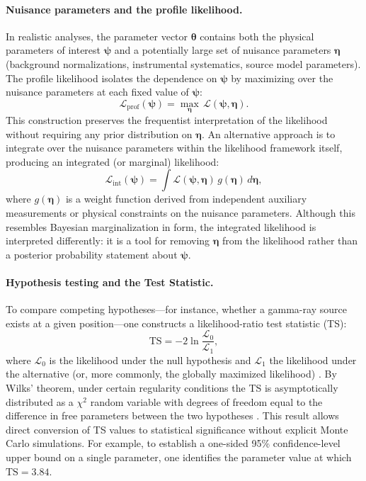 \paragraph{Nuisance parameters and the profile likelihood.}

In realistic analyses, the parameter vector $\boldsymbol{\theta}$ contains both the physical parameters of interest $\boldsymbol{\psi}$ and a potentially large set of nuisance parameters $\boldsymbol{\eta}$ (background normalizations, instrumental systematics, source model parameters). The profile likelihood isolates the dependence on $\boldsymbol{\psi}$ by maximizing over the nuisance parameters at each fixed value of $\boldsymbol{\psi}$:
\begin{equation}
\mathcal{L}_{\mathrm{prof}}(\boldsymbol{\psi}) = \max_{\boldsymbol{\eta}} \, \mathcal{L}(\boldsymbol{\psi}, \boldsymbol{\eta}).
\label{eq:profile_likelihood}
\end{equation}
This construction preserves the frequentist interpretation of the likelihood without requiring any prior distribution on $\boldsymbol{\eta}$. An alternative approach is to integrate over the nuisance parameters within the likelihood framework itself, producing an integrated (or marginal) likelihood:
\begin{equation}
\mathcal{L}_{\mathrm{int}}(\boldsymbol{\psi}) = \int \mathcal{L}(\boldsymbol{\psi}, \boldsymbol{\eta}) \, g(\boldsymbol{\eta}) \, d\boldsymbol{\eta},
\label{eq:integrated_likelihood}
\end{equation}
where $g(\boldsymbol{\eta})$ is a weight function derived from independent auxiliary measurements or physical constraints on the nuisance parameters. Although this resembles Bayesian marginalization in form, the integrated likelihood is interpreted differently: it is a tool for removing $\boldsymbol{\eta}$ from the likelihood rather than a posterior probability statement about $\boldsymbol{\psi}$.

\paragraph{Hypothesis testing and the Test Statistic.}

To compare competing hypotheses---for instance, whether a gamma-ray source exists at a given position---one constructs a likelihood-ratio test statistic (TS):
\begin{equation}
\mathrm{TS} = -2 \ln \frac{\mathcal{L}_0}{\mathcal{L}_1},
\label{eq:ts}
\end{equation}
where $\mathcal{L}_0$ is the likelihood under the null hypothesis and $\mathcal{L}_1$ the likelihood under the alternative (or, more commonly, the globally maximized likelihood) \cite{Mattox:1996}. By Wilks' theorem, under certain regularity conditions the TS is asymptotically distributed as a $\chi^2$ random variable with degrees of freedom equal to the difference in free parameters between the two hypotheses \cite{Wilks:1938}. This result allows direct conversion of TS values to statistical significance without explicit Monte Carlo simulations. For example, to establish a one-sided 95\% confidence-level upper bound on a single parameter, one identifies the parameter value at which $\mathrm{TS} = 3.84$.

